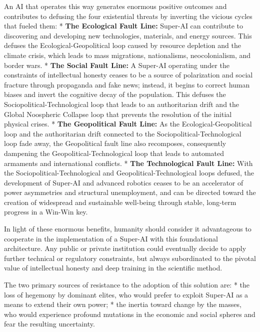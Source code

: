 \documentclass[11pt,a4paper,oneside]{article} %
\begin{document}
An AI that operates this way generates enormous positive outcomes and
contributes to defusing the four existential threats by inverting the
vicious cycles that fueled them: * \textbf{The Ecological Fault Line:}
Super-AI can contribute to discovering and developing new technologies,
materials, and energy sources. This defuses the Ecological-Geopolitical
loop caused by resource depletion and the climate crisis, which leads to
mass migrations, nationalisms, neocolonialism, and border wars. *
\textbf{The Social Fault Line:} A Super-AI operating under the
constraints of intellectual honesty ceases to be a source of
polarization and social fracture through propaganda and fake news;
instead, it begins to correct human biases and invert the cognitive
decay of the population. This defuses the Sociopolitical-Technological
loop that leads to an authoritarian drift and the Global Noospheric
Collapse loop that prevents the resolution of the initial physical
crises. * \textbf{The Geopolitical Fault Line:} As the
Ecological-Geopolitical loop and the authoritarian drift connected to
the Sociopolitical-Technological loop fade away, the Geopolitical fault
line also recomposes, consequently dampening the
Geopolitical-Technological loop that leads to automated armaments and
international conflicts. * \textbf{The Technological Fault Line:} With
the Sociopolitical-Technological and Geopolitical-Technological loops
defused, the development of Super-AI and advanced robotics ceases to be
an accelerator of power asymmetries and structural unemployment, and can
be directed toward the creation of widespread and sustainable well-being
through stable, long-term progress in a Win-Win key.

\hypertarget{consensus}{%
\label{consensus}}

In light of these enormous benefits, humanity should consider it
advantageous to cooperate in the implementation of a Super-AI with this
foundational architecture. Any public or private institution could
eventually decide to apply further technical or regulatory constraints,
but always subordinated to the pivotal value of intellectual honesty and
deep training in the scientific method.

\hypertarget{resistances-to-overcome}{%
\label{resistances-to-overcome}}

The two primary sources of resistance to the adoption of this solution
are: * the loss of hegemony by dominant elites, who would prefer to
exploit Super-AI as a means to extend their own power; * the inertia
toward change by the masses, who would experience profound mutations in
the economic and social spheres and fear the resulting uncertainty.
\end{document}
